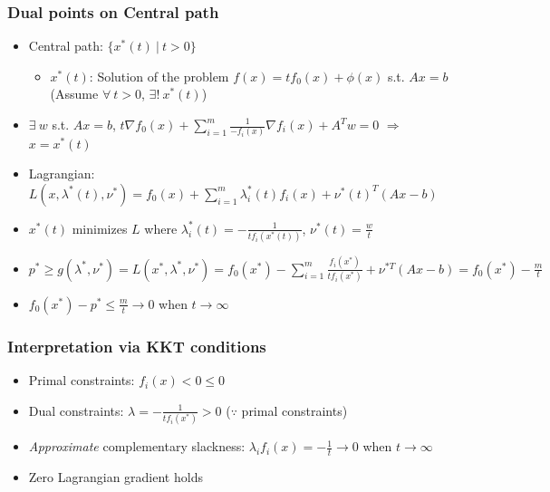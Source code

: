 \subsubsection*{Dual points on Central path}
\begin{itemize}
    \item Central path: $\{x^\ast(t)~|~t>0\}$
    \begin{itemize}
        \item $x^\ast(t)$: Solution of the problem $f(x)=tf_0(x)+\phi(x)$ s.t. $Ax=b$ (Assume $\forall~t>0$, $\exists!~x^\ast(t)$)
    \end{itemize}
    \item $\exists~w$ s.t. $Ax=b$, $t\nabla f_0(x)+\sum_{i=1}^m\frac{1}{-f_i(x)}\nabla f_i(x)+A^Tw = 0$ $\Rightarrow$ $x=x^\ast(t)$
    \item Lagrangian: $L(x,\lambda^\ast(t),\nu^\ast)=f_0(x)+\sum_{i=1}^{m}\lambda_i^\ast(t)f_i(x)+\nu^\ast(t)^T(Ax-b)$
    \item $x^\ast(t)$ minimizes $L$ where $\lambda_i^\ast(t)=-\frac{1}{tf_i(x^\ast(t))}$, $\nu^\ast(t)=\frac{w}{t}$
    \item $p^\ast\geq g(\lambda^\ast,\nu^\ast)=L(x^\ast,\lambda^\ast,\nu^\ast)=f_0(x^\ast)-\sum_{i=1}^m\frac{f_i(x^\ast)}{tf_i(x^\ast)}+\nu^{\ast T}(Ax-b)=f_0(x^\ast)-\frac{m}{t}$
    \item $f_0(x^\ast)-p^\ast\leq\frac{m}{t}\rightarrow 0$ when $t\rightarrow\infty$
\end{itemize}

\subsubsection*{Interpretation via KKT conditions}
\begin{itemize}
    \item Primal constraints: $f_i(x)<0\leq 0$
    \item Dual constraints: $\lambda=-\frac{1}{tf_i(x^\ast)}>0$ ($\because$ primal constraints)
    \item \textit{Approximate} complementary slackness: $\lambda_if_i(x)=-\frac{1}{t}\rightarrow 0$ when $t\rightarrow\infty$
    \item Zero Lagrangian gradient holds
\end{itemize}

